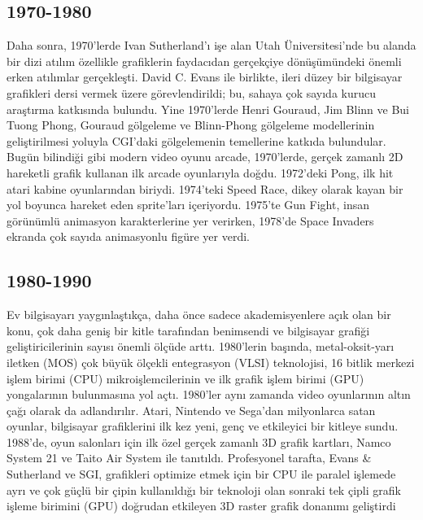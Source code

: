 \documentclass{IEEEtran}
\begin{document}
\subsection{1970-1980}
Daha sonra, 1970'lerde Ivan Sutherland'ı işe alan Utah Üniversitesi'nde bu alanda bir dizi atılım özellikle grafiklerin faydacıdan gerçekçiye dönüşümündeki önemli erken atılımlar gerçekleşti. David C. Evans ile birlikte, ileri düzey bir bilgisayar grafikleri dersi vermek üzere görevlendirildi; bu, sahaya çok sayıda kurucu araştırma katkısında bulundu.  Yine 1970'lerde Henri Gouraud, Jim Blinn ve Bui Tuong Phong, Gouraud gölgeleme ve Blinn-Phong gölgeleme modellerinin geliştirilmesi yoluyla CGI'daki gölgelemenin temellerine katkıda bulundular. Bugün bilindiği gibi modern video oyunu arcade, 1970'lerde, gerçek zamanlı 2D hareketli grafik kullanan ilk arcade oyunlarıyla doğdu. 1972'deki Pong, ilk hit atari kabine oyunlarından biriydi. 1974'teki Speed Race, dikey olarak kayan bir yol boyunca hareket eden sprite'ları içeriyordu. 1975'te Gun Fight, insan görünümlü animasyon karakterlerine yer verirken, 1978'de Space Invaders ekranda çok sayıda animasyonlu figüre yer verdi.
\subsection{1980-1990}
 Ev bilgisayarı yaygınlaştıkça, daha önce sadece akademisyenlere açık olan bir konu, çok daha geniş bir kitle tarafından benimsendi ve bilgisayar grafiği geliştiricilerinin sayısı önemli ölçüde arttı. 1980'lerin başında, metal-oksit-yarı iletken (MOS) çok büyük ölçekli entegrasyon (VLSI) teknolojisi, 16 bitlik merkezi işlem birimi (CPU) mikroişlemcilerinin ve ilk grafik işlem birimi (GPU) yongalarının bulunmasına yol açtı. 1980'ler aynı zamanda video oyunlarının altın çağı olarak da adlandırılır. Atari, Nintendo ve Sega'dan milyonlarca satan oyunlar, bilgisayar grafiklerini ilk kez yeni, genç ve etkileyici bir kitleye sundu. 1988'de, oyun salonları için ilk özel gerçek zamanlı 3D grafik kartları, Namco System 21 ve Taito Air System ile tanıtıldı. Profesyonel tarafta, Evans & Sutherland ve SGI, grafikleri optimize etmek için bir CPU ile paralel işlemede ayrı ve çok güçlü bir çipin kullanıldığı bir teknoloji olan sonraki tek çipli grafik işleme birimini (GPU) doğrudan etkileyen 3D raster grafik donanımı geliştirdi\cite{CG}
\end{document}
